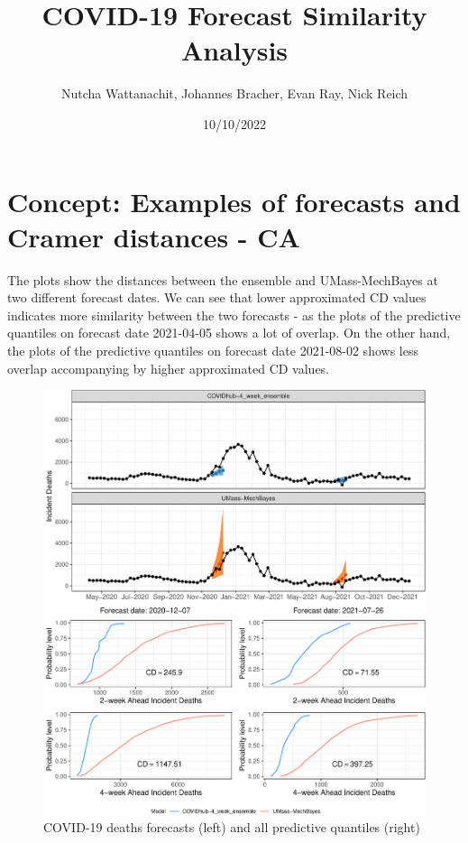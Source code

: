 \documentclass[
]{article}
\title{COVID-19 Forecast Similarity Analysis}
\author{Nutcha Wattanachit, Johannes Bracher, Evan Ray, Nick Reich}
\date{10/10/2022}
\begin{document}
\maketitle

\hypertarget{concept-examples-of-forecasts-and-cramer-distances---ca}{%
\section{Concept: Examples of forecasts and Cramer distances -
CA}\label{concept-examples-of-forecasts-and-cramer-distances---ca}}

The plots show the distances between the ensemble and UMass-MechBayes at
two different forecast dates. We can see that lower approximated CD
values indicates more similarity between the two forecasts - as the
plots of the predictive quantiles on forecast date 2021-04-05 shows a
lot of overlap. On the other hand, the plots of the predictive quantiles
on forecast date 2021-08-02 shows less overlap accompanying by higher
approximated CD values.

\begin{figure}

{\centering \includegraphics{sim_analysis_4_files/figure-latex/concept_ca-1} 

}

\caption{COVID-19 deaths forecasts (left) and all predictive quantiles (right)}\label{fig:concept_ca}
\end{figure}
\end{document}
